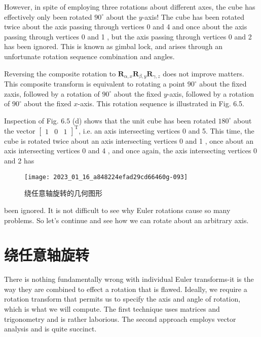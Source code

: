 However, in spite of employing three rotations about different axes, the cube has effectively only been rotated $90^{\circ}$ about the $y$-axis! The cube has been rotated twice about the axis passing through vertices 0 and 4 and once about the axis passing through vertices 0 and 1 , but the axis passing through vertices 0 and 2 has been ignored. This is known as gimbal lock, and arises through an unfortunate rotation sequence combination and angles.

Reversing the composite rotation to $\mathbf{R}_{\alpha, x} \mathbf{R}_{\beta, y} \mathbf{R}_{\gamma, z}$ does not improve matters. This composite transform is equivalent to rotating a point $90^{\circ}$ about the fixed zaxis, followed by a rotation of $90^{\circ}$ about the fixed $y$-axis, followed by a rotation of $90^{\circ}$ about the fixed $x$-axis. This rotation sequence is illustrated in Fig. 6.5.

Inspection of Fig. $6.5$ (d) shows that the unit cube has been rotated $180^{\circ}$ about the vector $\left[\begin{array}{lll}1 & 0 & 1\end{array}\right]^{\mathrm{T}}$, i.e. an axis intersecting vertices 0 and 5. This time, the cube is rotated twice about an axis intersecting vertices 0 and 1 , once about an axis intersecting vertices 0 and 4 , and once again, the axis intersecting vertices 0 and 2 has 

\begin{figure}[h!]
    \centering
    \texttt{[image: 2023\_01\_16\_a848224efad29cd66460g-093]}
    \caption[short]{绕任意轴旋转的几何图形}
\end{figure}

been ignored. It is not difficult to see why Euler rotations cause so many problems. So let's continue and see how we can rotate about an arbitrary axis.

\section{绕任意轴旋转}
There is nothing fundamentally wrong with individual Euler transforms-it is the way they are combined to effect a rotation that is flawed. Ideally, we require a rotation transform that permits us to specify the axis and angle of rotation, which is what we will compute. The first technique uses matrices and trigonometry and is rather laborious. The second approach employs vector analysis and is quite succinct.


